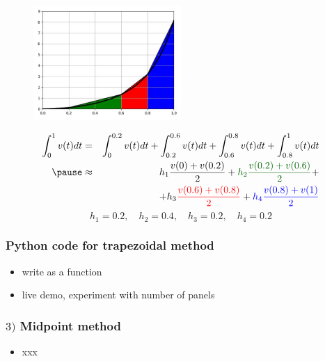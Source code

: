 \documentclass[english,14pt]{beamer}
\newcommand\red[1]{{\color{red} #1}}
\newcommand\blue[1]{{\color{blue} #1}}
\newcommand\darkGreen[1]{{\color{darkGreen} #1}}
\begin{document}
\begin{frame}[fragile]

\frametitle{}

\begin{figure}[ht]
	\centering
	\includegraphics[width=0.5\textwidth]{figures/fourPanel}
\end{figure}
\vspace*{-5mm}
{\small
\begin{eqnarray*}
\int_0^1 v(t)dt & = & \int_0^{0.2} v(t)dt + \int_{0.2}^{0.6} v(t)dt + \int_{0.6}^{0.8} v(t)dt + \int_{0.8}^1 v(t)dt \\
\pause
&\approx & h_1 \frac{v(0) + v(0.2)}{2} + \darkGreen{h_2 \frac{v(0.2) + v(0.6)}{2}} + \\
& & +h_3 \red{\frac{v(0.6) + v(0.8)}{2}} + \blue{h_4 \frac{v(0.8) + v(1)}{2}} 
\end{eqnarray*}
}
\pause
\vspace*{-5mm}
\[
h_1 = 0.2, \quad h_2 = 0.4, \quad h_3 = 0.2, \quad h_4 = 0.2
\]

\end{frame}


\begin{frame}[fragile]

\frametitle{Python code for trapezoidal method}

\begin{itemize}
	\item write as a function
	\item live demo, experiment with number of panels
\end{itemize}

\end{frame}


\begin{frame}[fragile]

\frametitle{$3)$ Midpoint method}

\begin{itemize}
	\item xxx
\end{itemize}

\end{frame}
\end{document}
